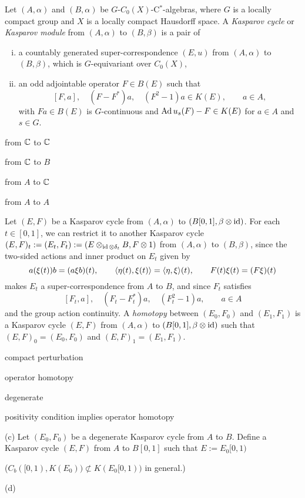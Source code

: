 \documentclass{../../large}
\begin{document}
\begin{prb}
Let $(A,\alpha)$ and $(B,\alpha)$ be $G$-$C_0(X)$-C$^*$-algebras, where $G$ is a locally compact group and $X$ is a locally compact Hausdorff space.
A \emph{Kasparov cycle} or \emph{Kasparov module} from $(A,\alpha)$ to $(B,\beta)$ is a pair of
\begin{enumerate}[(i)]
\item a countably generated super-correspondence $(E,u)$ from $(A,\alpha)$ to $(B,\beta)$, which is $G$-equivariant over $C_0(X)$,
\item an odd adjointable operator $F\in B(E)$ such that
\[[F,a],\quad(F-F^*)a,\quad(F^2-1)a\in K(E),\qquad a\in A,\]
with $Fa\in B(E)$ is $G$-continuous and $\operatorname{Ad} u_s(F)-F\in K(E)$ for $a\in A$ and $s\in G$.
\end{enumerate}
\begin{parts}
\item from $\mathbb{C}$ to $\mathbb{C}$
\item from $\mathbb{C}$ to $B$
\item from $A$ to $\mathbb{C}$
\item from $A$ to $A$
\end{parts}
\end{prb}



\begin{prb}
Let $(E,F)$ be a Kasparov cycle from $(A,\alpha)$ to $(B[0,1],\beta\otimes\operatorname{id})$.
For each $t\in[0,1]$, we can restrict it to another Kasparov cycle $(E,F)_t:=(E_t,F_t):=(E\otimes_{\operatorname{id}\otimes\delta_t}B,F\otimes1)$ from $(A,\alpha)$ to $(B,\beta)$, since the two-sided actions and inner product on $E_t$ given by
\[a(\xi(t))b=(a\xi b)(t),\qquad\langle\eta(t),\xi(t)\rangle=\langle\eta,\xi\rangle(t),\qquad F(t)\xi(t)=(F\xi)(t)\]
makes $E_t$ a super-correspondence from $A$ to $B$, and since $F_t$ satisfies
\[[F_t,a],\quad (F_t-F_t^*)a,\quad (F_t^2-1)a,\qquad a\in A\]
and the group action continuity.
A \emph{homotopy} between $(E_0,F_0)$ and $(E_1,F_1)$ is a Kasparov cycle $(E,F)$ from $(A,\alpha)$ to $(B[0,1],\beta\otimes\operatorname{id})$ such that $(E,F)_0=(E_0,F_0)$ and $(E,F)_1=(E_1,F_1)$.

\begin{parts}
\item compact perturbation
\item operator homotopy
\item degenerate
\item positivity condition implies operator homotopy
\end{parts}
\end{prb}
\begin{pf}

(c)
Let $(E_0,F_0)$ be a degenerate Kasparov cycle from $A$ to $B$.
Define a Kasparov cycle $(E,F)$ from $A$ to $B[0,1]$ such that $E:=E_0[0,1)$

($C_b([0,1),K(E_0))\not\subset K(E_0[0,1))$ in general.)

(d)


\end{pf}
\end{document}
